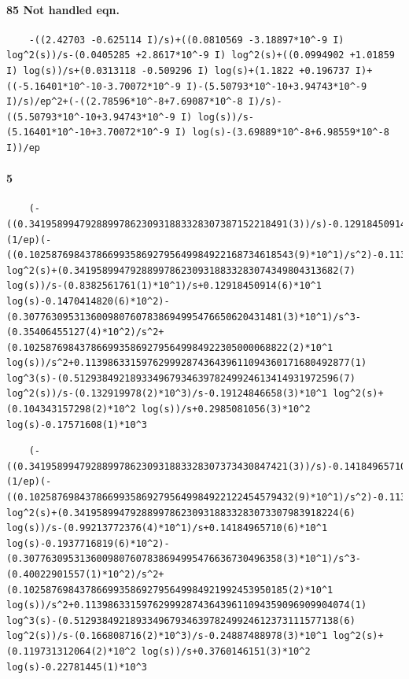 \documentclass{article}
\makeatletter
\renewcommand\subparagraph{%
 \@startsection {subparagraph}{5}{1em }{1.25ex \@plus 1ex
 \@minus .2ex}{-1em}{\normalfont \normalsize \bfseries }}%
\newcommand{\CJ}[1]{\textcolor{RoyalBlue}{#1}}
\newcommand{\WN}[1]{\textcolor{RawSienna}{#1}}
\newcommand{\WNNH}{\WN{Not handled eqn. }}
\makeatother
\begin{document}
\paragraph{85	\WNNH}
\subparagraph{\CJ{4}}
\begin{verbatim}
	-((2.42703 -0.625114 I)/s)+((0.0810569 -3.18897*10^-9 I) log^2(s))/s-(0.0405285 +2.8617*10^-9 I) log^2(s)+((0.0994902 +1.01859 I) log(s))/s+(0.0313118 -0.509296 I) log(s)+(1.1822 +0.196737 I)+((-5.16401*10^-10-3.70072*10^-9 I)-(5.50793*10^-10+3.94743*10^-9 I)/s)/ep^2+(-((2.78596*10^-8+7.69087*10^-8 I)/s)-((5.50793*10^-10+3.94743*10^-9 I) log(s))/s-(5.16401*10^-10+3.70072*10^-9 I) log(s)-(3.69889*10^-8+6.98559*10^-8 I))/ep
\end{verbatim}
\paragraph{5}
\begin{verbatim}
	(-((0.3419589947928899786230931883328307387152218491(3))/s)-0.12918450914(7)*10^1)/ep^2+(1/ep)(-((0.10258769843786699358692795649984922168734618543(9)*10^1)/s^2)-0.11398633159762999287436439611094361761455281466(3) log^2(s)+(0.34195899479288997862309318833283074349804313682(7) log(s))/s-(0.8382561761(1)*10^1)/s+0.12918450914(6)*10^1 log(s)-0.1470414820(6)*10^2)-(0.3077630953136009807607838694995476650620431481(3)*10^1)/s^3-(0.35406455127(4)*10^2)/s^2+(0.10258769843786699358692795649984922305000068822(2)*10^1 log(s))/s^2+0.11398633159762999287436439611094360171680492877(1) log^3(s)-(0.51293849218933496793463978249924613414931972596(7) log^2(s))/s-(0.132919978(2)*10^3)/s-0.19124846658(3)*10^1 log^2(s)+(0.104343157298(2)*10^2 log(s))/s+0.2985081056(3)*10^2 log(s)-0.17571608(1)*10^3
\end{verbatim}
\subparagraph{\CJ{113}}
\begin{verbatim}
	(-((0.3419589947928899786230931883328307373430847421(3))/s)-0.14184965710(7)*10^1)/ep^2+(1/ep)(-((0.10258769843786699358692795649984922122454579432(9)*10^1)/s^2)-0.11398633159762999287436439611094358537143515056(3) log^2(s)+(0.34195899479288997862309318833283073307983918224(6) log(s))/s-(0.99213772376(4)*10^1)/s+0.14184965710(6)*10^1 log(s)-0.1937716819(6)*10^2)-(0.3077630953136009807607838694995476636730496358(3)*10^1)/s^3-(0.40022901557(1)*10^2)/s^2+(0.10258769843786699358692795649984921992453950185(2)*10^1 log(s))/s^2+0.11398633159762999287436439611094359096909904074(1) log^3(s)-(0.51293849218933496793463978249924612373111577138(6) log^2(s))/s-(0.166808716(2)*10^3)/s-0.24887488978(3)*10^1 log^2(s)+(0.119731312064(2)*10^2 log(s))/s+0.3760146151(3)*10^2 log(s)-0.22781445(1)*10^3
\end{verbatim}
\end{document}
